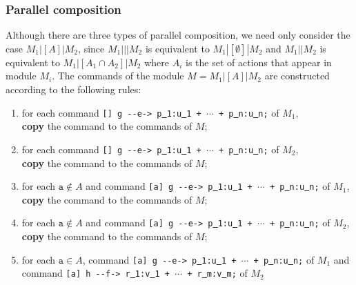 \documentclass{article}
\newcommand{\arci}[1]{{-}{-}{#1}->}
\renewcommand{\_}{\underline{~}}
\newcommand{\code}[1]{\texttt{#1}}
\begin{document}
\subsubsection*{Parallel composition}
Although there are three types of parallel composition, we need only consider the case
$M_1|[A]|M_2$, since $M_1|||M_2$ is equivalent to $M_1|[\emptyset]|M_2$ and $M_1||M_2$ is equivalent to $M_1|[A_1 \cap A_2]|M_2$ where $A_i$ is the set of actions that appear in module $M_i$. 
The commands of the module $M = M_1|[A]|M_2$ are constructed according to the following rules:

\begin{enumerate}
	\item for each command \code{[] g \arci{e} p\_1:u\_1 + $\cdots$ + p\_n:u\_n;} of $M_1$, \\ 
	\textbf{copy} the command to the commands of $M$;
	
	\item for each command \code{[] g \arci{e} p\_1:u\_1 + $\cdots$ + p\_n:u\_n;} of $M_2$, \\ 
	\textbf{copy} the command to the commands of $M$;

	\item for each $\code{a} \not\in A$ and command \code{[a] g \arci{e}  p\_1:u\_1 + $\cdots$ + p\_n:u\_n;} of $M_1$, \\ 
	\textbf{copy} the command to the commands of $M$;

	\item for each $\code{a} \not\in A$ and command \code{[a] g \arci{e}  p\_1:u\_1 + $\cdots$ + p\_n:u\_n;} of $M_2$, \\ 
	\textbf{copy} the command to the commands of $M$;


	\item for each $\code{a} \in A$, command \code{[a] g \arci{e} p\_1:u\_1 + $\cdots$ + p\_n:u\_n;} of $M_1$ and \\command \code{[a]  h \arci{f} r\_1:v\_1 + $\cdots$ + r\_m:v\_m;} of $M_2$ 
	\begin{itemize}
		

\end{itemize}
\end{enumerate}
\end{document}
